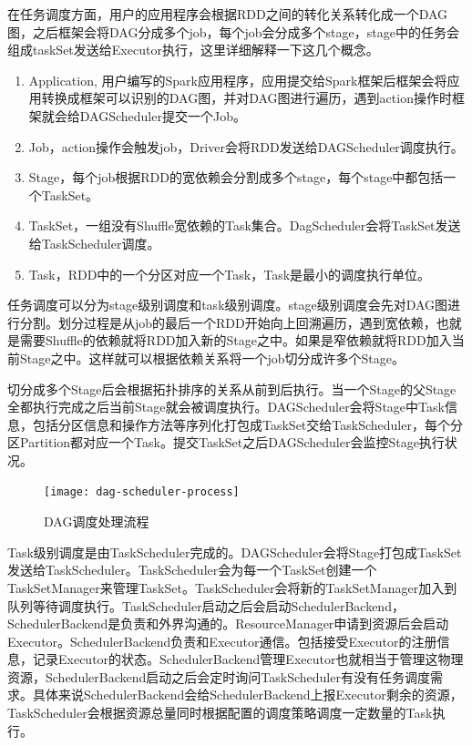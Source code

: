 在任务调度方面，用户的应用程序会根据RDD之间的转化关系转化成一个DAG图，之后框架会将DAG分成多个job，每个job会分成多个stage，stage中的任务会组成taskSet发送给Executor执行，这里详细解释一下这几个概念。

\begin{enumerate}
    \item Application, 用户编写的Spark应用程序，应用提交给Spark框架后框架会将应用转换成框架可以识别的DAG图，并对DAG图进行遍历，遇到action操作时框架就会给DAGScheduler提交一个Job。
    \item Job，action操作会触发job，Driver会将RDD发送给DAGScheduler调度执行。
    \item Stage，每个job根据RDD的宽依赖会分割成多个stage，每个stage中都包括一个TaskSet。
    \item TaskSet，一组没有Shuffle宽依赖的Task集合。DagScheduler会将TaskSet发送给TaskScheduler调度。
    \item Task，RDD中的一个分区对应一个Task，Task是最小的调度执行单位。
\end{enumerate}

任务调度可以分为stage级别调度和task级别调度。stage级别调度会先对DAG图进行分割。划分过程是从job的最后一个RDD开始向上回溯遍历，遇到宽依赖，也就是需要Shuffle的依赖就将RDD加入新的Stage之中。如果是窄依赖就将RDD加入当前Stage之中。这样就可以根据依赖关系将一个job切分成许多个Stage。

切分成多个Stage后会根据拓扑排序的关系从前到后执行。当一个Stage的父Stage全都执行完成之后当前Stage就会被调度执行。DAGScheduler会将Stage中Task信息，包括分区信息和操作方法等序列化打包成TaskSet交给TaskScheduler，每个分区Partition都对应一个Task。提交TaskSet之后DAGScheduler会监控Stage执行状况。

\begin{figure}
    \centering
    \texttt{[image: dag-scheduler-process]}
    \caption{DAG调度处理流程}
    \label{fig:dag-scheduler-process}
\end{figure}

Task级别调度是由TaskScheduler完成的。DAGScheduler会将Stage打包成TaskSet发送给TaskScheduler。TaskScheduler会为每一个TaskSet创建一个TaskSetManager来管理TaskSet。TaskScheduler会将新的TaskSetManager加入到队列等待调度执行。TaskScheduler启动之后会启动SchedulerBackend，SchedulerBackend是负责和外界沟通的。ResourceManager申请到资源后会启动Executor。SchedulerBackend负责和Executor通信。包括接受Executor的注册信息，记录Executor的状态。SchedulerBackend管理Executor也就相当于管理这物理资源，SchedulerBackend启动之后会定时询问TaskScheduler有没有任务调度需求。具体来说SchedulerBackend会给SchedulerBackend上报Executor剩余的资源，TaskScheduler会根据资源总量同时根据配置的调度策略调度一定数量的Task执行。

